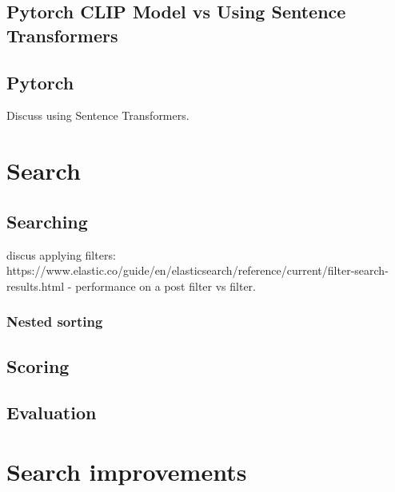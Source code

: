 \documentclass[article, 10pt]{article}
\begin{document}
\subsection{Pytorch CLIP Model vs Using Sentence Transformers}



\subsection{Pytorch} 
Discuss using Sentence Transformers. 


\section{Search}
\subsection{Searching}
discus applying filters: https://www.elastic.co/guide/en/elasticsearch/reference/current/filter-search-results.html
  - performance on a post filter vs filter.
\subsubsection{Nested sorting}
\subsection{Scoring}

\subsection{Evaluation}



\section{Search improvements}
\end{document}
